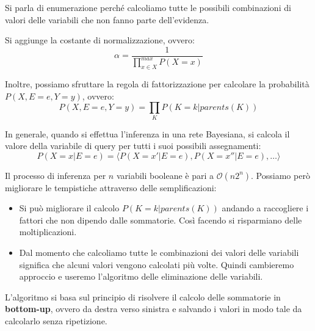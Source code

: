 Si parla di enumerazione perché calcoliamo tutte le possibili combinazioni di valori
delle variabili che non fanno parte dell'evidenza.
\begin{nota}
    Si aggiunge la costante di normalizzazione, ovvero:
    \begin{equation*}
        \alpha = \frac{1}{\prod_{x\in X}^{max}P(X = x)}
    \end{equation*}
\end{nota}
Inoltre, possiamo sfruttare la regola di fattorizzazione per calcolare la probabilità
$P(X,E=e,Y=y)$, ovvero:
\begin{equation*}
    P(X,E=e,Y=y) = \prod_{K} P(K=k | parents(K))
\end{equation*}

In generale, quando si effettua l'inferenza in una rete Bayesiana, si calcola il
valore della variabile di query per tutti i suoi possibili assegnamenti:
\begin{equation*}
    P(X=x|E=e) = \langle P(X = x'|E = e), P(X = x''|E = e),\dots \rangle
\end{equation*}

Il processo di inferenza per $n$ variabili booleane è pari a $\mathcal{O}(n2^n)$.
Possiamo però migliorare le tempistiche attraverso delle semplificazioni:
\begin{itemize}
    \item Si può migliorare il calcolo $P(K=k | parents(K))$ andando a raccogliere
          i fattori che non dipendo dalle sommatorie. Così facendo si risparmiano
          delle moltiplicazioni.
    \item Dal momento che calcoliamo tutte le combinazioni dei valori delle
          variabili significa che alcuni valori vengono calcolati più volte. 
          Quindi cambieremo approccio e useremo l'algoritmo delle eliminazione 
          delle variabili.
\end{itemize}

L'algoritmo si basa sul principio di risolvere il calcolo delle sommatorie in
\textbf{bottom-up}, ovvero da destra verso sinistra e salvando i valori in modo 
tale da calcolarlo senza ripetizione.

